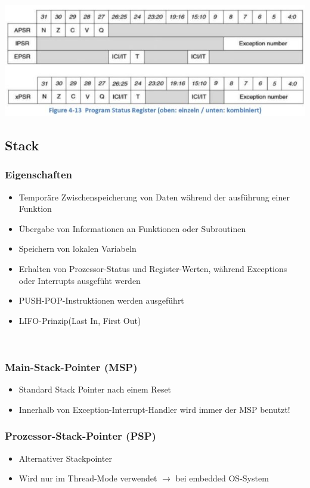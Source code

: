 \includegraphics[width=14.5cm]{images/programstatusregister}

\clearpage
\subsection{Stack}
\begin{minipage}{9cm}
	\subsubsection{Eigenschaften}
	\begin{itemize}
            \item Temporäre Zwischenspeicherung von Daten während der ausführung einer Funktion
            \item Übergabe von Informationen an Funktionen oder Subroutinen
            \item Speichern von lokalen Variabeln
            \item Erhalten von Prozessor-Status und Register-Werten, während Exceptions oder Interrupts ausgefüht werden
            \item PUSH-POP-Instruktionen werden ausgeführt
            \item LIFO-Prinzip(Last In, First Out)
        \end{itemize}
\end{minipage}
%
\begin{minipage}{0.5cm}
	\-\
\end{minipage}
%
\begin{minipage}{9cm}
	 \subsubsection{Main-Stack-Pointer (MSP)}
        \begin{itemize}
            \item Standard Stack Pointer nach einem Reset
            \item Innerhalb von Exception-Interrupt-Handler wird immer der MSP benutzt!
            \end{itemize}
        \subsubsection{Prozessor-Stack-Pointer (PSP)}
        \begin{itemize}
            \item Alternativer Stackpointer
            \item Wird nur im Thread-Mode verwendet
            \subitem $\rightarrow$ bei embedded OS-System
        \end{itemize}   

\end{minipage}

